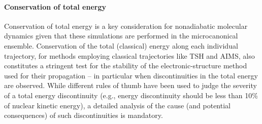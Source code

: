 \documentclass[9pt,bestpractices]{livecoms}
\begin{document}
\paragraph{Conservation of total energy}
Conservation of total energy is a key consideration for nonadiabatic molecular dynamics given that these simulations are performed in the microcanonical ensemble. Conservation of the total (classical) energy along each individual trajectory, for methods employing classical trajectories like TSH and AIMS, also constitutes a stringent test for the stability of the electronic-structure method used for their propagation -- in particular when discontinuities in the total energy are observed. While different rules of thumb have been used to judge the severity of a total energy discontinuity (e.g., energy discontinuity should be less than 10\% of nuclear kinetic energy), a detailed analysis of the cause (and potential consequences) of such discontinuities is mandatory.
\end{document}
